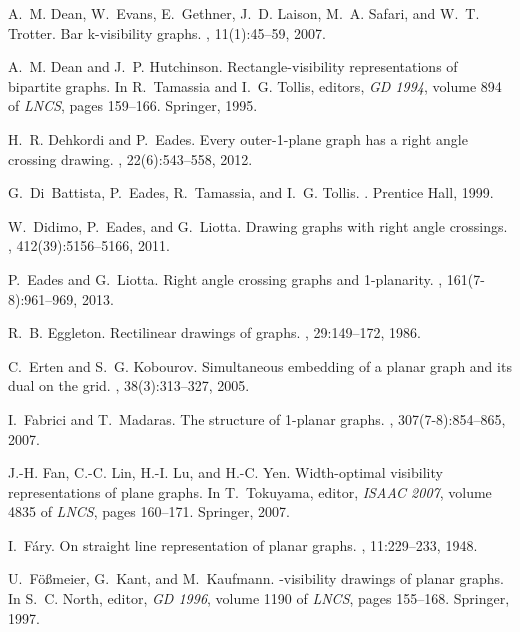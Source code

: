 \documentclass[runningheads]{llncs}
\begin{document}
\begin{thebibliography}{10}
A.~M. Dean, W.~Evans, E.~Gethner, J.~D. Laison, M.~A. Safari, and W.~T.
  Trotter.
\newblock Bar k-visibility graphs.
, 11(1):45--59, 2007.

A.~M. Dean and J.~P. Hutchinson.
\newblock Rectangle-visibility representations of bipartite graphs.
\newblock In R.~Tamassia and I.~G. Tollis, editors, {\em {GD} 1994}, volume 894
  of {\em LNCS}, pages 159--166. Springer, 1995.

H.~R. Dehkordi and P.~Eades.
\newblock Every outer-1-plane graph has a right angle crossing drawing.
, 22(6):543--558, 2012.

G.~Di~Battista, P.~Eades, R.~Tamassia, and I.~G. Tollis.
.
\newblock Prentice Hall, 1999.

W.~Didimo, P.~Eades, and G.~Liotta.
\newblock Drawing graphs with right angle crossings.
, 412(39):5156--5166, 2011.

P.~Eades and G.~Liotta.
\newblock Right angle crossing graphs and 1-planarity.
, 161(7-8):961--969, 2013.

R.~B. Eggleton.
\newblock Rectilinear drawings of graphs.
, 29:149--172, 1986.

C.~Erten and S.~G. Kobourov.
\newblock Simultaneous embedding of a planar graph and its dual on the grid.
, 38(3):313--327, 2005.

I.~Fabrici and T.~Madaras.
\newblock The structure of 1-planar graphs.
, 307(7-8):854--865, 2007.

J.-H. Fan, C.-C. Lin, H.-I. Lu, and H.-C. Yen.
\newblock Width-optimal visibility representations of plane graphs.
\newblock In T.~Tokuyama, editor, {\em ISAAC 2007}, volume 4835 of {\em LNCS},
  pages 160--171. Springer, 2007.

I.~F\'{a}ry.
\newblock On straight line representation of planar graphs.
, 11:229--233, 1948.

U.~F{\"o}{\ss}meier, G.~Kant, and M.~Kaufmann.
-visibility drawings of planar graphs.
\newblock In S.~C. North, editor, {\em {GD} 1996}, volume 1190 of {\em {LNCS}},
  pages 155--168. Springer, 1997.


\end{thebibliography}
\end{document}
